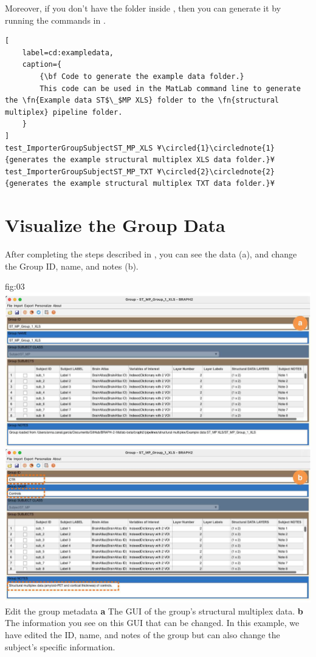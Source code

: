 \documentclass[justified]{tufte-handout}
\begin{document}
Moreover, if you don't have the  folder inside , then you can generate it by running the commands in .

\begin{lstlisting}[
	label=cd:exampledata,
	caption={
		{\bf Code to generate the example data folder.}
		This code can be used in the MatLab command line to generate the \fn{Example data ST$\_$MP XLS} folder to the \fn{structural multiplex} pipeline folder.
	}
]
test_ImporterGroupSubjectST_MP_XLS ¥\circled{1}\circlednote{1}{generates the example structural multiplex XLS data folder.}¥
test_ImporterGroupSubjectST_MP_TXT ¥\circled{2}\circlednote{2}{generates the example structural multiplex TXT data folder.}¥
\end{lstlisting}


\section{Visualize the Group Data}

After completing the steps described in , you can see the data (a), and change the Group ID, name, and notes (b). 

	{fig:03}
	{
	\includegraphics{fig03.jpg}
	}
	{Edit the group metadata}
	{ 
	{\bf a} The GUI of the group's structural multiplex data. 
	{\bf b} The information you see on this GUI that can be changed. In this example, we have edited the ID, name, and notes of the group but can also change the subject's specific information.
	}
\end{document}

